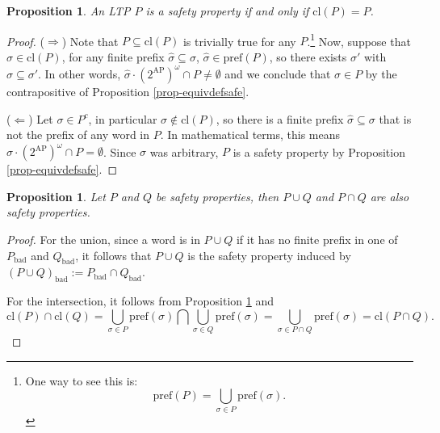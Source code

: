 \documentclass{tufte-handout} %
\newtheorem{prop}[thm]{Proposition}
\theoremstyle{definition}
\theoremstyle{remark}
\newcommand{\0}{\textsf{0}}
\newcommand{\1}{\textsf{1}}
\newcommand{\AP}{\text{AP}}
\newcommand{\pref}{\text{pref}}
\newcommand{\cl}{\text{cl}}
\begin{document}
\begin{prop}\label{prop-safeclos}
	An LTP $P$ is a safety property if and only if $\cl(P) = P$.
\end{prop}
\begin{proof}
	($\Rightarrow$) Note that $P \subseteq \cl(P)$ is trivially true for any $P$.\footnote{One way to see this is: \[\pref(P) = \bigcup_{\sigma \in P} \pref(\sigma).\]} Now, suppose that $\sigma \in \cl(P)$, for any finite prefix  $\hat{\sigma} \subseteq \sigma$, $\hat{\sigma} \in \pref(P)$, so there exists $\sigma'$ with $\hat{\sigma} \subseteq \sigma'$. In other words, $\hat{\sigma}\cdot (2^{\AP})^{\omega}\cap P \neq \emptyset$ and we conclude that $\sigma \in P$ by the contrapositive of Proposition \ref{prop-equivdefsafe}.
	
	($\Leftarrow$) Let $\sigma \in P^c$, in particular $\sigma \notin \cl(P)$, so there is a finite prefix $\hat{\sigma}\subseteq \sigma$ that is not the prefix of any word in $P$. In mathematical terms, this means $\hat{\sigma}\cdot (2^{\AP})^{\omega}\cap P = \emptyset$. Since $\sigma$ was arbitrary, $P$ is a safety property by Proposition \ref{prop-equivdefsafe}.
\end{proof}
\begin{prop}
	Let $P$ and $Q$ be safety properties, then $P \cup Q$ and $P \cap Q$ are also safety properties.
\end{prop}
\begin{proof}%
	For the union, since a word is in $P \cup Q$ if it has no finite prefix in one of $P_{\text{bad}}$ and $Q_{\text{bad}}$, it follows that $P\cup Q$ is the safety property induced by $(P\cup Q)_{\text{bad}} := P_{\text{bad}} \cap Q_{\text{bad}}$.
	
	For the intersection, it follows from Proposition \ref{prop-safeclos} and 
	\[\cl(P) \cap \cl(Q) = \bigcup_{\sigma \in P} \pref(\sigma) \bigcap \bigcup_{\sigma \in Q} \pref(\sigma) = \bigcup_{\sigma \in P\cap Q} \pref(\sigma) = \cl(P\cap Q).\]
\end{proof}
\end{document}
